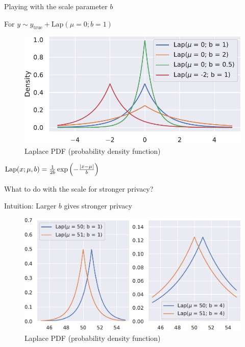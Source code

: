 \documentclass[12pt,aspectratio=169,handout]{beamer}
\begin{document}
\begin{frame}{Playing with the scale parameter $b$}

For $y \sim y_{\mathrm{true}} + \textrm{Lap}(\mu = 0; b=1)$


\begin{figure}
\includegraphics[width=0.6\linewidth]{img/laplace-distributions.pdf}
\caption{Laplace PDF (probability density function)}
\end{figure}
$
\textrm{Lap}(x; \mu, b) = \frac{1}{2b} \exp \left( - \frac{\abs{x - \mu}}{b}  \right)
$

What to do with the scale for stronger privacy?
	
\end{frame}


\begin{frame}{Intuition: Larger $b$ gives stronger privacy}

\begin{figure}
\includegraphics[width=0.9\linewidth]{img/laplace-grid1.pdf}
\caption{Laplace PDF (probability density function)}
\end{figure}
	
\end{frame}
\end{document}
